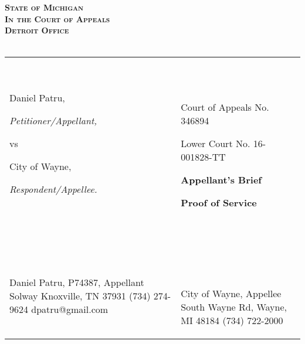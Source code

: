 \documentclass[12pt,\documentclassflag]{michiganCourtOfAppealsBrief}
\begin{document}
\begin{centering}
\bf\scshape State of Michigan\\In the Court of Appeals\\Detroit Office\\~\\ 
\rm 

\makeandtab
\setlength{\tabcolsep}{20pt}%
\begin{tabular}{p{} p{}}
\cline{1-2}
  {~

  \raggedright Daniel Patru,\par
  \hfill\textit{Petitioner/Appellant,}
  \vspace{.5\baselineskip}\par
  vs\par
  \vspace{.5\baselineskip}
  \raggedright City of Wayne,\par
  \hfill\textit{Respondent/Appellee.}
  
  ~} &  {~
       \par\par
       \hfill Court of Appeals No. 346894\par
       \hfill Lower Court No. 16-001828-TT\par\vspace{\baselineskip}
       \hfill \textbf{Appellant's Brief}\par
       \hfill \textbf{Proof of Service}       
  ~}
  \\ \cline{1-2}\vspace{2mm}
  {~ \par
  Daniel Patru, P74387, Appellant\newline%
  3309 Solway\newline%
  Knoxville, TN 37931\newline%
  (734) 274-9624\newline%
  dpatru@gmail.com\newline\newline%
  ~} & {~ \par~\par
       
       City of Wayne, Appellee\newline%
       3355 South Wayne Rd,\newline%
       Wayne, MI 48184\newline%
       (734) 722-2000\newline\newline%

}
\end{tabular}
\end{centering}
\end{document}
